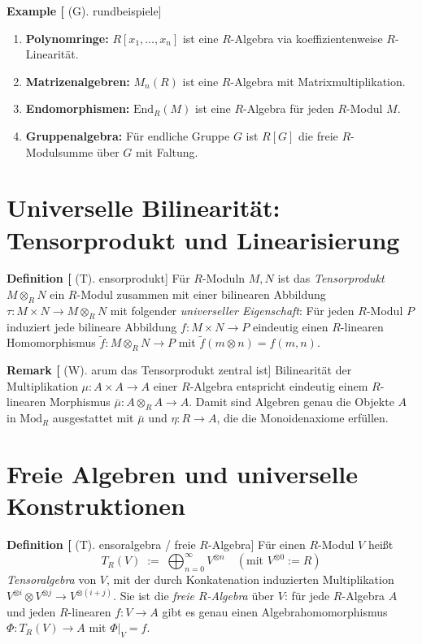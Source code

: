 \documentclass[10pt, letterpaper]{article}
\newcommand{\Mod}{\mathrm{Mod}}
\newcommand{\CustomHeading}[3]{%
  \par\medskip\noindent%
  \textbf{#1 #2} \textnormal{(#3)}.\enskip%
}
\newenvironment{DEF}[2]{\begin{unitbox}\CustomHeading{Definition}{#1}{#2}}{\end{unitbox}}
\newenvironment{REM}[2]{\begin{unitbox}\CustomHeading{Remark}{#1}{#2}}{\end{unitbox}}
\newenvironment{EXA}[2]{\begin{unitbox}\CustomHeading{Example}{#1}{#2}}{\end{unitbox}}
\begin{document}
\begin{EXA}[Grundbeispiele]
\begin{enumerate}[label=(\alph*), leftmargin=*]
\item \textbf{Polynomringe:} \(R[x_1,\dots,x_n]\) ist eine \(R\)-Algebra via koeffizientenweise \(R\)-Linearität.
\item \textbf{Matrizenalgebren:} \(M_n(R)\) ist eine \(R\)-Algebra mit Matrixmultiplikation.
\item \textbf{Endomorphismen:} \(\mathrm{End}_R(M)\) ist eine \(R\)-Algebra für jeden \(R\)-Modul \(M\).
\item \textbf{Gruppenalgebra:} Für endliche Gruppe \(G\) ist \(R[G]\) die freie \(R\)-Modulsumme über \(G\) mit Faltung.
\end{enumerate}
\end{EXA}

\section{Universelle Bilinearität: Tensorprodukt und Linearisierung}
\begin{DEF}[Tensorprodukt]
Für \(R\)-Moduln \(M,N\) ist das \emph{Tensorprodukt} \(M\otimes_R N\) ein \(R\)-Modul
zusammen mit einer bilinearen Abbildung \(\tau:M\times N\to M\otimes_R N\) mit folgender \emph{universeller Eigenschaft}:
Für jeden \(R\)-Modul \(P\) induziert jede bilineare Abbildung \(f:M\times N\to P\) eindeutig einen \(R\)-linearen
Homomorphismus \(\tilde f:M\otimes_R N\to P\) mit \(\tilde f(m\otimes n)=f(m,n)\).
\end{DEF}

\begin{REM}[Warum das Tensorprodukt zentral ist]
Bilinearität der Multiplikation \(\mu:A\times A\to A\) einer \(R\)-Algebra entspricht eindeutig einem
\(R\)-linearen Morphismus \(\bar\mu:A\otimes_R A\to A\).
Damit sind Algebren genau die Objekte \(A\) in \(\Mod_R\) ausgestattet mit \(\bar\mu\) und \(\eta:R\to A\),
die die Monoidenaxiome erfüllen.
\end{REM}

\section{Freie Algebren und universelle Konstruktionen}
\label{sec:tensor-algebra}
\begin{DEF}[Tensoralgebra / freie \(R\)-Algebra]
Für einen \(R\)-Modul \(V\) heißt
\[
T_R(V)\;:=\;\bigoplus_{n=0}^{\infty} V^{\otimes n}
\quad(\text{mit }V^{\otimes 0}:=R)
\]
\emph{Tensoralgebra} von \(V\), mit der durch Konkatenation induzierten Multiplikation
\(V^{\otimes i}\otimes V^{\otimes j}\to V^{\otimes(i+j)}\).
Sie ist die \emph{freie \(R\)-Algebra} über \(V\): für jede \(R\)-Algebra \(A\) und jeden \(R\)-linearen
\(f:V\to A\) gibt es genau einen Algebra\-homomorphismus \(\Phi:T_R(V)\to A\) mit \(\Phi|_V=f\).
\end{DEF}
\end{document}
